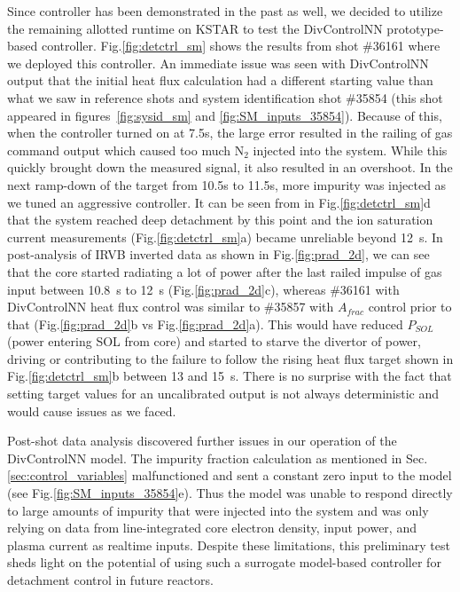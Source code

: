 Since \Afrac controller has been demonstrated in the past as well, we decided to utilize the remaining allotted runtime on KSTAR to test the DivControlNN prototype-based controller.
Fig.\ref{fig:detctrl_sm} shows the results from shot \#36161 where we deployed this controller.
An immediate issue was seen with DivControlNN output that the initial heat flux calculation had a different starting value than what we saw in reference shots and system identification shot \#35854 (this shot appeared in figures~\ref{fig:sysid_sm} and \ref{fig:SM_inputs_35854}).
Because of this, when the controller turned on at 7.5s, the large error resulted in the railing of gas command output which caused too much N$_2$ injected into the system.
While this quickly brought down the measured signal, it also resulted in an overshoot.
In the next ramp-down of the target from 10.5s to 11.5s, more impurity was injected as we tuned an aggressive controller.
It can be seen from \Afrac in Fig.\ref{fig:detctrl_sm}d that the system reached deep detachment by this point and the ion saturation current measurements (Fig.\ref{fig:detctrl_sm}a) became unreliable beyond 12~s.
In post-analysis of IRVB inverted data as shown in Fig.\ref{fig:prad_2d}, we can see that the core started radiating a lot of power after the last railed impulse of gas input between 10.8~s to 12~s (Fig.\ref{fig:prad_2d}c), whereas \#36161 with DivControlNN heat flux control was similar to \#35857 with $A_{frac}$ control prior to that (Fig.\ref{fig:prad_2d}b vs Fig.\ref{fig:prad_2d}a).
This would have reduced $P_{SOL}$ (power entering SOL from core) and started to starve the divertor of power, driving or contributing to the failure to follow the rising heat flux target shown in Fig.\ref{fig:detctrl_sm}b between 13 and 15~s.
There is no surprise with the fact that setting target values for an uncalibrated output is not always deterministic and would cause issues as we faced.

Post-shot data analysis discovered further issues in our operation of the DivControlNN model.
The impurity fraction calculation as mentioned in Sec.\ref{sec:control_variables} malfunctioned and sent a constant zero input to the model (see Fig.\ref{fig:SM_inputs_35854}e).
Thus the model was unable to respond directly to large amounts of impurity that were injected into the system and was only relying on data from line-integrated core electron density, input power, and plasma current as realtime inputs.
Despite these limitations, this preliminary test sheds light on the potential of using such a surrogate model-based controller for detachment control in future reactors.

